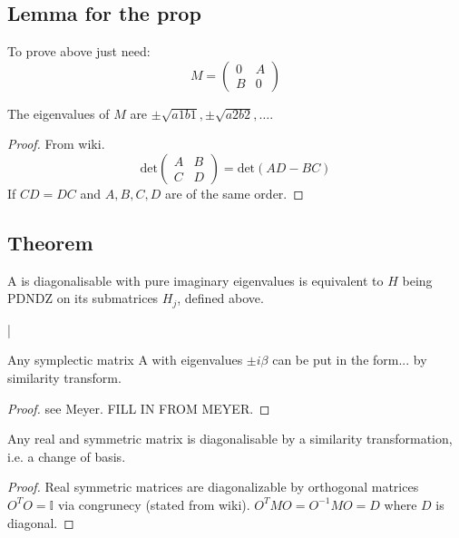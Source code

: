 \subsection{Lemma for the prop}
To prove above just need:
\begin{equation} M = \begin{pmatrix} 0 & A \\ B & 0 \end{pmatrix} \end{equation}
\begin{lemma}
The eigenvalues of $M$ are $\pm \sqrt{a1b1},\pm \sqrt{a2b2},\ldots$.
\end{lemma}
\begin{proof}
From wiki.
\begin{equation}
\text{det}\begin{pmatrix} A & B \\ C & D \end{pmatrix} = \text{det}(AD-BC)
\end{equation}
If $CD=DC$ and $A, B, C, D$ are of the same order.
\end{proof}



\subsection{Theorem}
\begin{theorem}
A is diagonalisable with pure imaginary eigenvalues is equivalent to $H$ being PDNDZ on its submatrices $H_j$, defined above.
\end{theorem}|


















\begin{lemma} Any symplectic matrix A with eigenvalues $\pm i\beta$ can be put in the form... by similarity transform. \label{lem:reala} \end{lemma}
\begin{proof}
see Meyer. FILL IN FROM MEYER.
\end{proof}

\begin{lemma} Any real and symmetric matrix is diagonalisable by a similarity transformation, i.e. a change of basis.  \label{lem:realsymm}
\end{lemma}
\begin{proof}
Real symmetric matrices are diagonalizable by orthogonal matrices $O^TO=\mathbb{I}$ via congrunecy (stated from wiki). $O^TMO = O^{-1}MO = D$ where $D$ is diagonal. 
\end{proof}


